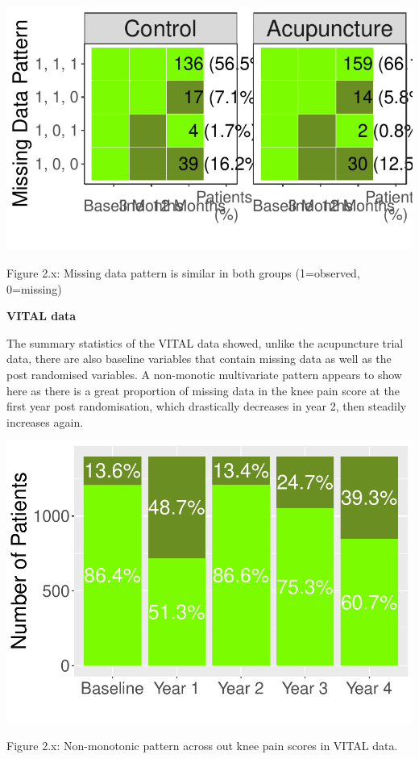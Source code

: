 \documentclass{article}
\newcommand{\pandocbounded}[1]{#1}
\begin{document}
\pandocbounded{\includegraphics[keepaspectratio]{Final_Report_files/figure-latex/unnamed-chunk-21-1.pdf}}

Figure 2.x: Missing data pattern is similar in both groups (1=observed,
0=missing)

\textbf{VITAL data}

The summary statistics of the VITAL data showed, unlike the acupuncture
trial data, there are also baseline variables that contain missing data
as well as the post randomised variables. A non-monotic multivariate
pattern appears to show here as there is a great proportion of missing
data in the knee pain score at the first year post randomisation, which
drastically decreases in year 2, then steadily increases again.

\pandocbounded{\includegraphics[keepaspectratio]{Final_Report_files/figure-latex/unnamed-chunk-22-1.pdf}}

Figure 2.x: Non-monotonic pattern across out knee pain scores in VITAL
data.
\end{document}
